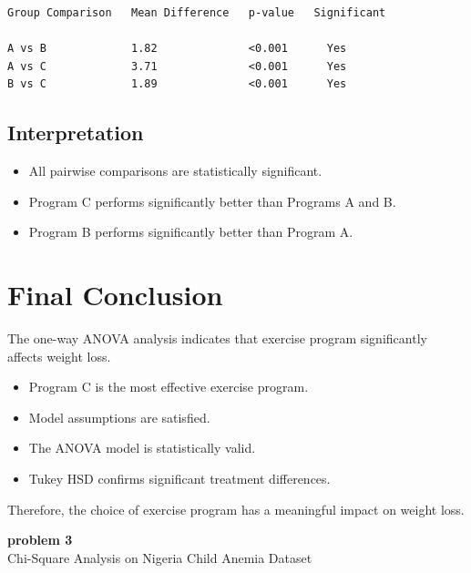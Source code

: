 \documentclass[12pt]{article}
\begin{document}
\begin{verbatim}
Group Comparison   Mean Difference   p-value   Significant

A vs B             1.82              <0.001      Yes
A vs C             3.71              <0.001      Yes
B vs C             1.89              <0.001      Yes
\end{verbatim}

\subsection*{Interpretation}

\begin{itemize}
    \item All pairwise comparisons are statistically significant.
    \item Program C performs significantly better than Programs A and B.
    \item Program B performs significantly better than Program A.
\end{itemize}

\section*{Final Conclusion}

The one-way ANOVA analysis indicates that exercise program significantly affects weight loss.

\begin{itemize}
    \item Program C is the most effective exercise program.
    \item Model assumptions are satisfied.
    \item The ANOVA model is statistically valid.
    \item Tukey HSD confirms significant treatment differences.
\end{itemize}

Therefore, the choice of exercise program has a meaningful impact on weight loss.

\newpage


\begin{center}
    {\LARGE \textbf{ problem 3}}\\[0.3cm]
    {\large Chi-Square Analysis on Nigeria Child Anemia Dataset}
\end{center}
\end{document}
